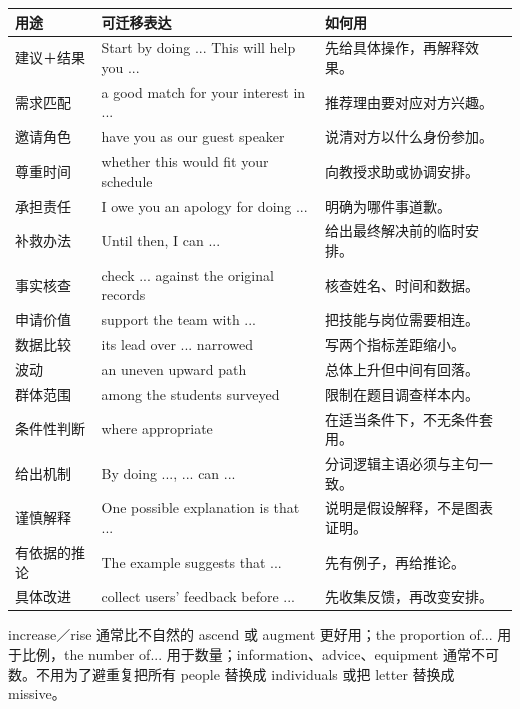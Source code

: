 \documentclass[11pt,a4paper,fontset=macnew]{ctexart}
\begin{document}
\begin{longtable}{L{25mm}L{72mm}L{56mm}}\toprule
\textbf{用途} & \textbf{可迁移表达} & \textbf{如何用}\\\midrule\endhead
建议＋结果 & Start by doing ... This will help you ... & 先给具体操作，再解释效果。\\
需求匹配 & a good match for your interest in ... & 推荐理由要对应对方兴趣。\\
邀请角色 & have you as our guest speaker & 说清对方以什么身份参加。\\
尊重时间 & whether this would fit your schedule & 向教授求助或协调安排。\\
承担责任 & I owe you an apology for doing ... & 明确为哪件事道歉。\\
补救办法 & Until then, I can ... & 给出最终解决前的临时安排。\\
事实核查 & check ... against the original records & 核查姓名、时间和数据。\\
申请价值 & support the team with ... & 把技能与岗位需要相连。\\
数据比较 & its lead over ... narrowed & 写两个指标差距缩小。\\
波动 & an uneven upward path & 总体上升但中间有回落。\\
群体范围 & among the students surveyed & 限制在题目调查样本内。\\
条件性判断 & where appropriate & 在适当条件下，不无条件套用。\\
给出机制 & By doing ..., ... can ... & 分词逻辑主语必须与主句一致。\\
谨慎解释 & One possible explanation is that ... & 说明是假设解释，不是图表证明。\\
有依据的推论 & The example suggests that ... & 先有例子，再给推论。\\
具体改进 & collect users’ feedback before ... & 先收集反馈，再改变安排。\\
\bottomrule\end{longtable}
\par\vspace{4pt}{\bfseries 从“显得高级”转向“说得准确”}\par\nopagebreak
increase／rise 通常比不自然的 ascend 或 augment 更好用；the proportion of... 用于比例，the number of... 用于数量；information、advice、equipment 通常不可数。不用为了避重复把所有 people 替换成 individuals 或把 letter 替换成 missive。
\end{document}
